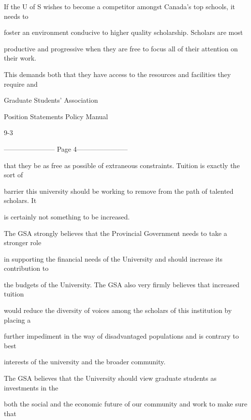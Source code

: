 If the U of S wishes to become a competitor amongst Canada’s top schools, it needs to  

foster  an  environment  conducive  to  higher  quality  scholarship.  Scholars  are  most  

productive and progressive when they are free to focus all of their attention on their work.  

This demands both that they have access to the resources and facilities they require and  



                                 Graduate Students’ Association  



                               Position Statements Policy Manual  



                                                 9-3  


----------------------- Page 4-----------------------

that they be as free as possible of extraneous constraints. Tuition is exactly the sort of  

barrier this university should be working to remove from the path of talented scholars. It  

is certainly not something to be increased.  



The GSA strongly believes that the Provincial Government needs to take a stronger role  

in supporting the financial needs of the University and should increase its contribution to  

the budgets of the University. The GSA also very firmly believes that increased tuition  

would reduce the diversity of voices among the scholars of this institution by placing a  

further  impediment  in  the  way  of  disadvantaged  populations  and  is  contrary  to  best  

interests of the university and the broader community.  



  



The GSA believes that the University should view graduate students as investments in the  

both the social and the economic future of our community and work to make sure that  

